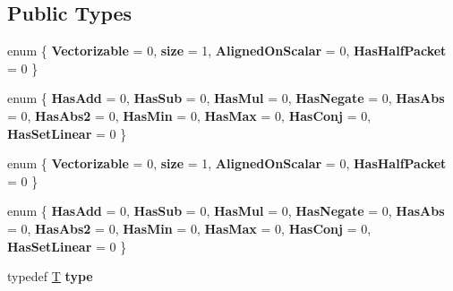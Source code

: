 \subsection*{Public Types}
\begin{DoxyCompactItemize}
\item 
\mbox{\label{struct_eigen_1_1internal_1_1packet__traits_ae2e8f71ab339939bfeb87303954d9d2e}} 
enum \{ {\bfseries Vectorizable} = 0, 
{\bfseries size} = 1, 
{\bfseries Aligned\+On\+Scalar} = 0, 
{\bfseries Has\+Half\+Packet} = 0
 \}
\item 
\mbox{\label{struct_eigen_1_1internal_1_1packet__traits_af2416daa96f2c08227782568a3343098}} 
enum \{ \newline
{\bfseries Has\+Add} = 0, 
{\bfseries Has\+Sub} = 0, 
{\bfseries Has\+Mul} = 0, 
{\bfseries Has\+Negate} = 0, 
\newline
{\bfseries Has\+Abs} = 0, 
{\bfseries Has\+Abs2} = 0, 
{\bfseries Has\+Min} = 0, 
{\bfseries Has\+Max} = 0, 
\newline
{\bfseries Has\+Conj} = 0, 
{\bfseries Has\+Set\+Linear} = 0
 \}
\item 
\mbox{\label{struct_eigen_1_1internal_1_1packet__traits_ab531a30200219d051aa5feeb3a230ad7}} 
enum \{ {\bfseries Vectorizable} = 0, 
{\bfseries size} = 1, 
{\bfseries Aligned\+On\+Scalar} = 0, 
{\bfseries Has\+Half\+Packet} = 0
 \}
\item 
\mbox{\label{struct_eigen_1_1internal_1_1packet__traits_aab798cb113fdb3c96a292dfc9c7d9aad}} 
enum \{ \newline
{\bfseries Has\+Add} = 0, 
{\bfseries Has\+Sub} = 0, 
{\bfseries Has\+Mul} = 0, 
{\bfseries Has\+Negate} = 0, 
\newline
{\bfseries Has\+Abs} = 0, 
{\bfseries Has\+Abs2} = 0, 
{\bfseries Has\+Min} = 0, 
{\bfseries Has\+Max} = 0, 
\newline
{\bfseries Has\+Conj} = 0, 
{\bfseries Has\+Set\+Linear} = 0
 \}
\item 
\mbox{\label{struct_eigen_1_1internal_1_1packet__traits_a811c5bde6641fd0f7a8f88be5e11ce27}} 
typedef \hyperlink{group___sparse_core___module}{T} {\bfseries type}

\end{DoxyCompactItemize}
